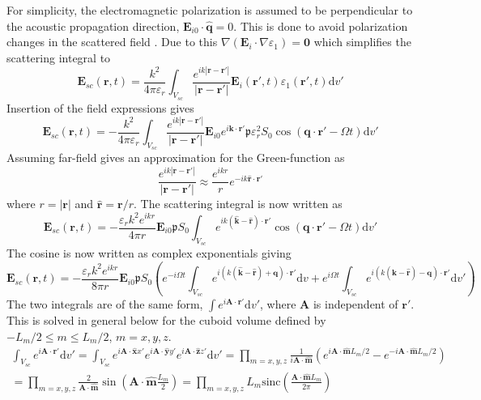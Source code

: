 \documentclass[10pt,a4paper,draft]{scrartcl}
\begin{document}
	For simplicity, the electromagnetic polarization is assumed to be perpendicular to the acoustic propagation direction, $\bm{E}_{i0} \cdot \bm{\hat{q}} = 0$. This is done to avoid polarization changes in the scattered field \cite{Korpel1988}. Due to this $\nabla(\bm{E}_i \cdot \nabla \varepsilon_1) = \bm{0}$ which simplifies the scattering integral to
	\begin{equation*}
		\bm{E}_{sc}(\bm{r},t) = \frac{k^2}{4\pi\varepsilon_r} \int_{V_{sc}} \frac{e^{ik |\bm{r}-\bm{r'}| }}{ |\bm{r}-\bm{r'}|} \bm{E}_i (\bm{r'},t) \varepsilon_1 (\bm{r'},t) \mathrm{d}v'
	\end{equation*}
	Insertion of the field expressions gives
	\begin{equation*}
	\bm{E}_{sc}(\bm{r},t) = -\frac{k^2}{4\pi\varepsilon_r} \int_{V_{sc}} \frac{e^{ik |\bm{r}-\bm{r'}| }}{ |\bm{r}-\bm{r'}|} \bm{E}_{i0} e^{i\bm{k} \cdot \bm{r}'} \mathfrak{p} \varepsilon_r^2 S_0 \cos(\bm{q} \cdot \bm{r}' - \Omega t) \mathrm{d}v'
	\end{equation*}
	Assuming far-field gives an approximation for the Green-function as \cite{Kristensson2008}
	\begin{equation*}
		\frac{e^{ik |\bm{r}-\bm{r'}| }}{ |\bm{r}-\bm{r'}|} \approx \frac{e^{ikr}}{r} e^{-ik \bm{\hat{r}} \cdot \bm{r}'}
	\end{equation*}
	where $r = |\bm{r}|$ and $\bm{\hat{r}} = \bm{r}/r$. The scattering integral is now written as
	\begin{equation*}
	\bm{E}_{sc}(\bm{r},t) = -\frac{\varepsilon_rk^2 e^{ikr}}{4\pi r} \bm{E}_{i0} \mathfrak{p} S_0 \int_{V_{sc}} e^{ik ( \bm{\hat{k}} - \bm{\hat{r}} ) \cdot \bm{r}'} \cos(\bm{q} \cdot \bm{r}' - \Omega t) \mathrm{d}v'
	\end{equation*}
	The cosine is now written as complex exponentials giving
	\begin{equation*}
		\bm{E}_{sc}(\bm{r},t) = -\frac{\varepsilon_rk^2 e^{ikr}}{8\pi r} \bm{E}_{i0} \mathfrak{p} S_0 \left( e^{-i\Omega t} \int_{V_{sc}} e^{i( k(\bm{\hat{k}} - \bm{\hat{r}}) + \bm{q} ) \cdot \bm{r}'} \mathrm{d}v + e^{i\Omega t} \int_{V_{sc}} e^{i( k(\bm{\hat{k}} - \bm{\hat{r}}) - \bm{q} ) \cdot \bm{r}'} \mathrm{d}v' \right)
	\end{equation*}
	The two integrals are of the same form, $\int e^{i\bm{A} \cdot \bm{r}'} \mathrm{d}v'$, where $\bm{A}$ is independent of $\bm{r}'$. This is solved in general below for the cuboid volume defined by $-L_m/2 \leq m \leq L_m/2$, $m = x,y,z$.
	\begin{multline*}
		\int_{V_{sc}} e^{i\bm{A} \cdot \bm{r}'} \mathrm{d}v' =
		\int_{V_{sc}} e^{i\bm{A} \cdot \bm{\hat{x}} x'} e^{i\bm{A} \cdot \bm{\hat{y}} y'} e^{i\bm{A} \cdot \bm{\hat{z}} z'} \mathrm{d}v' =
		\prod_{m = x,y,z} \frac{1}{i \bm{A} \cdot \bm{\hat{m}}} \left( e^{i\bm{A} \cdot \bm{\hat{m}} L_m/2} - e^{-i\bm{A} \cdot \bm{\hat{m}} L_m/2} \right) \\
		= \prod_{m = x,y,z} \frac{2}{\bm{A} \cdot \bm{\hat{m}}} \sin \left(\bm{A} \cdot \bm{\hat{m}} \frac{L_m}{2} \right) =
		\prod_{m = x,y,z} L_m \text{sinc} \left( \frac{\bm{A} \cdot \bm{\hat{m}} L_m}{2\pi} \right)
	\end{multline*}
\end{document}
